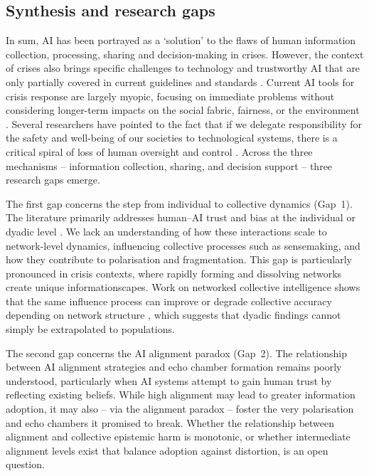 \documentclass[sn-apacite]{sn-jnl}
\begin{document}
\subsection{Synthesis and research gaps}\label{sec:synthesis}

In sum, AI has been portrayed as a `solution' to the flaws of human information collection, processing, sharing and decision-making in crises. However, the context of crises also brings specific challenges to technology and trustworthy AI that are only partially covered in current guidelines and standards \citep{ozmen2023six}. Current AI tools for crisis response are largely myopic, focusing on immediate problems without considering longer-term impacts on the social fabric, fairness, or the environment \citep{harika2024harnessing}. Several researchers have pointed to the fact that if we delegate responsibility for the safety and well-being of our societies to technological systems, there is a critical spiral of loss of human oversight and control \citep{comes2024ai}. Across the three mechanisms -- information collection, sharing, and decision support -- three research gaps emerge.

The first gap concerns the step from individual to collective dynamics (Gap~1). The literature primarily addresses human--AI trust and bias at the individual or dyadic level \citep{glikson2020human,glickman2024human}. We lack an understanding of how these interactions scale to network-level dynamics, influencing collective processes such as sensemaking, and how they contribute to polarisation and fragmentation. This gap is particularly pronounced in crisis contexts, where rapidly forming and dissolving networks create unique informationscapes. Work on networked collective intelligence shows that the same influence process can improve or degrade collective accuracy depending on network structure \citep{lorenz2011social,becker2017network}, which suggests that dyadic findings cannot simply be extrapolated to populations.

The second gap concerns the AI alignment paradox (Gap~2). The relationship between AI alignment strategies and echo chamber formation remains poorly understood, particularly when AI systems attempt to gain human trust by reflecting existing beliefs. While high alignment may lead to greater information adoption, it may also -- via the alignment paradox \citep{west2025alignment} -- foster the very polarisation and echo chambers it promised to break. Whether the relationship between alignment and collective epistemic harm is monotonic, or whether intermediate alignment levels exist that balance adoption against distortion, is an open question.
\end{document}
